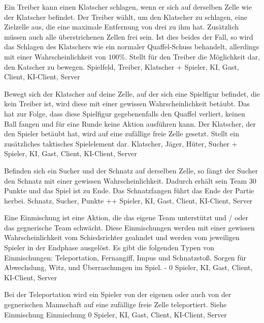         {Ein Treiber kann einen Klatscher schlagen, wenn er sich auf derselben Zelle wie der Klatscher befindet. Der Treiber wählt, um den Klatscher zu schlagen, eine Zielzelle aus, die eine maximale Entfernung von drei zu ihm hat. Zusätzlich müssen auch alle überstrichenen Zellen frei sein. Ist dies beides der Fall, so wird das Schlagen des Klatschers wie ein normaler Quaffel-Schuss behandelt, allerdings mit einer Wahrscheinlichkeit von $100\%$.}
        {Stellt für den Treiber die Möglichkeit dar, den Katscher zu bewegen.}
        {Spielfeld, Treiber, Klatscher}
        {+}
        {Spieler, KI, Gast, Client, KI-Client, Server}
        
        {Bewegt sich der Klatscher auf deine Zelle, auf der sich eine Spielfigur befindet, die kein Treiber ist, wird diese mit einer gewissen Wahrscheinlichkeit betäubt. Das hat zur Folge, dass diese Spielfigur gegebenenfalls den Quaffel verliert, keinen Ball fangen und für eine Runde keine Aktion ausführen kann. Der Klatscher, der den Spieler betäubt hat, wird auf eine zufällige freie Zelle gesetzt.}
        {Stellt ein zusätzliches taktisches Spielelement dar.}
        {Klatscher, Jäger, Hüter, Sucher}
        {+}
        {Spieler, KI, Gast, Client, KI-Client, Server}
        
        {Befinden sich ein Sucher und der Schnatz auf derselben Zelle, so fängt der Sucher den Schnatz mit einer gewissen Wahrscheinlichkeit. Dadurch erhält sein Team 30 Punkte und das Spiel ist zu Ende.}
        {Das Schnatzfangen führt das Ende der Partie herbei.}
        {Schnatz, Sucher, Punkte}
        {++}
        {Spieler, KI, Gast, Client, KI-Client, Server}
        

        {Eine  Einmischung ist eine Aktion, die das eigene Team unterstützt und / oder das gegnerische Team schwächt. Diese Einmischungen werden mit einer gewissen Wahrscheinlichkeit vom Schiedsrichter geahndet und werden vom jeweiligen Spieler in der Endphase ausgelöst. Es gibt die folgenden Typen von Einmischungen: Teleportation, Fernangiff, Impus und Schnatzstoß.}
        {Sorgen für Abwechslung, Witz, und Überraschungen im Spiel.}
        {-}
        {0}
        {Spieler, KI, Gast, Client, KI-Client, Server}

        {Bei der Teleportation wird ein Spieler von der eigenen oder auch von der gegnerischen Mannschaft auf eine zufällige freie Zelle teleportiert.}
        {Siehe Einmischung}
        {Einmischung}
        {0}
        {Spieler, KI, Gast, Client, KI-Client, Server}

